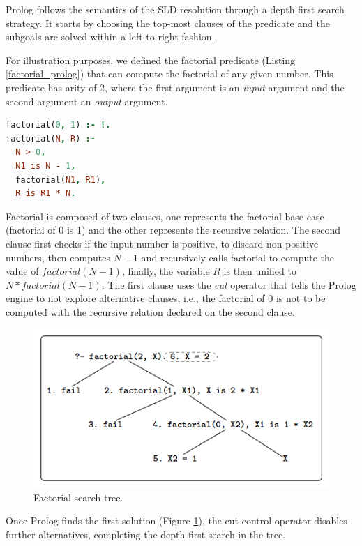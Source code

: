 Prolog follows the semantics of the SLD resolution through a depth first search strategy.
It starts by choosing the top-most clauses of the predicate and the subgoals are solved
within a left-to-right fashion.

For illustration purposes, we defined the factorial predicate (Listing \ref{factorial_prolog}) that can compute the factorial of
any given number. This predicate has arity of 2, where the first argument is an \textit{input} argument and the second argument
an \textit{output} argument.

\begin{lstlisting}[language=prolog,basicstyle=\footnotesize,float,frame=single,caption={Factorial function in Prolog.},label=factorial_prolog]
factorial(0, 1) :- !.
factorial(N, R) :-
  N > 0,
  N1 is N - 1,
  factorial(N1, R1),
  R is R1 * N.
\end{lstlisting}

Factorial is composed of two clauses, one represents the factorial base case (factorial of 0 is 1) and
the other represents the recursive relation. The second clause first checks if the input number
is positive, to discard non-positive numbers, then computes $N - 1$ and recursively
calls factorial to compute the value of $factorial(N-1)$, finally, the variable $R$ is then unified
to $N * factorial(N-1)$. The first clause uses the \textit{cut} operator that tells the Prolog engine to not explore alternative
clauses, i.e., the factorial of 0 is not to be computed with the recursive relation declared on the second clause.

\begin{figure}[ht]
  \centering
    \includegraphics[scale=0.6]{factorial.png}
  \caption{Factorial search tree.}
  \label{fig:factorial_tree}
\end{figure}

Once Prolog finds the first solution (Figure \ref{fig:factorial_tree}), the cut control operator disables further
alternatives, completing the depth first search in the tree.

